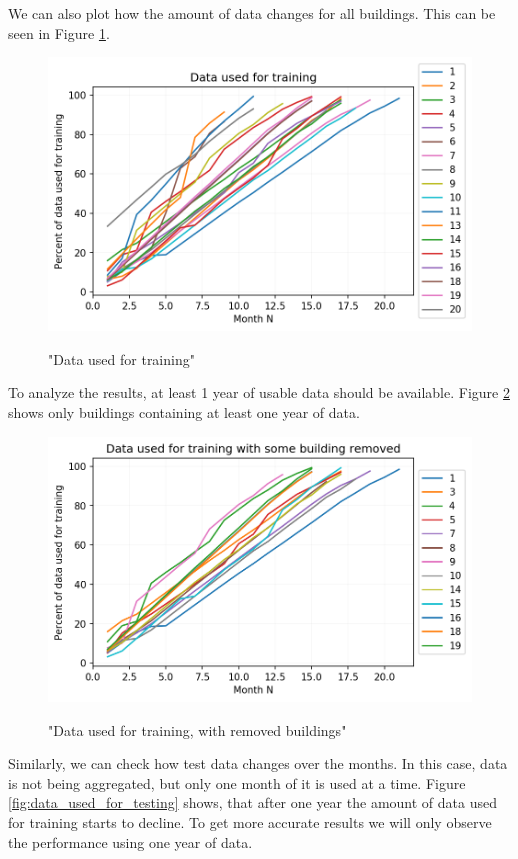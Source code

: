 We can also plot how the amount of data changes for all buildings.
This can be seen in Figure \ref{fig:data_used_for_training}.

\begin{figure}[H]
	\centering
	\caption{"Data used for training"}
	\includegraphics[width=.7\textwidth]{Figures/EC/DYN/data_used_for_training_all.png}
	\label{fig:data_used_for_training}
\end{figure}

To analyze the results, at least 1 year of usable data should be available. 
Figure \ref{fig:data_used_for_training_removed} shows only buildings containing at least one year of data.
\begin{figure}[H]
	\centering
	\caption{"Data used for training, with removed buildings"}
	\includegraphics[width=.7\textwidth]{Figures/EC/DYN/data_used_for_training_removed_short.png}
	\label{fig:data_used_for_training_removed}
\end{figure}

Similarly, we can check how test data changes over the months. 
In this case, data is not being aggregated, but only one month of it is used at a time.
Figure \ref{fig:data_used_for_testing} shows, that after one year
the amount of data used for training starts to decline. 
To get more accurate results we will only observe the performance using one year of data. 

